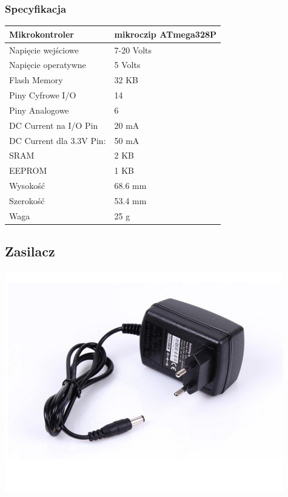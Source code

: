 \documentclass[12pt]{article}
\begin{document}
\subsubsection{Specyfikacja}
\begin{center}
\begin{tabular}{ | m{5cm} | m{3cm} | } 
\hline
Mikrokontroler&mikroczip ATmega328P\\
\hline
Napięcie wejściowe &  7-20 Volts\\ 
\hline
Napięcie operatywne &  5 Volts\\ 
\hline
\hline
Flash Memory& 32 KB\\
\hline
Piny Cyfrowe I/O & 14\\  
\hline
Piny Analogowe & 6\\ 
\hline
DC Current na I/O Pin& 20 mA\\ 
\hline
DC Current dla 3.3V Pin:& 50 mA\\ 
\hline
SRAM& 2 KB\\ 
\hline
EEPROM& 1 KB\\ 
\hline
Wysokość &  68.6 mm  \\ 
\hline
Szerokość &  53.4 mm \\ 
\hline
Waga &  25 g  \\ 
\hline
\end{tabular}
\end{center}
\subsection{Zasilacz}
\begin{center}
\begin{minipage}[H]{.85\textwidth}
    \includegraphics[width=1.0\linewidth]{zasilacz.png}
\end{minipage}
\end{center}
\end{document}
